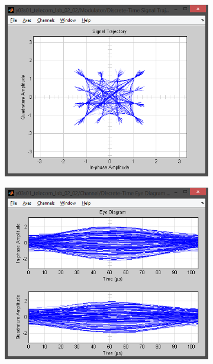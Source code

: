 \documentclass[
	a4paper,
	oneside,
	BCOR = 10mm,
	DIV = 12,
	12pt,
	headings = normal,
]{scrartcl}
\begin{document}
\begin{figure}[!htbp]
\begin{subfigure}{\textwidth / 3}
						\caption{}
						\label{subfig:freqshift-signal-trajectory-in}
					\end{subfigure}%
					\begin{subfigure}{\textwidth / 3}
						\centering
						\includegraphics[height = 7\baselineskip]{../01-solution/00-SNR-100db-noshift-modulator-signal-trajectory.png}
						\caption{}
						\label{subfig:freqshift-scatter-plot-in}
					\end{subfigure}
					\begin{subfigure}{\textwidth / 3}
						\centering
						\includegraphics[height = 7\baselineskip]{../01-solution/02-freqshift-1000-hz-channel-eye-diagram.png}

\end{subfigure}
\end{figure}
\end{document}
